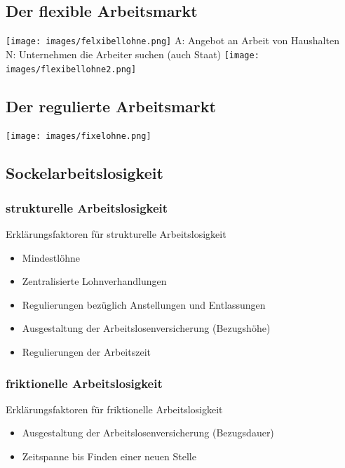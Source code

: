 \subsection{Der flexible Arbeitsmarkt}
\begin{multicols}{2}
	\texttt{[image: images/felxibellohne.png]}
	A: Angebot an Arbeit von Haushalten\\
	N: Unternehmen die Arbeiter suchen (auch Staat)
	\vfill\null
	\columnbreak
	\texttt{[image: images/flexibellohne2.png]}
\end{multicols}

\subsection{Der regulierte Arbeitsmarkt}
	\texttt{[image: images/fixelohne.png]}

\subsection{Sockelarbeitslosigkeit}
\begin{multicols}{2}
\subsubsection{strukturelle Arbeitslosigkeit}
\label{sec:strukturelleArbeitslosigkeit}
Erklärungsfaktoren für strukturelle Arbeitslosigkeit
\begin{itemize}
	\item Mindestlöhne
	\item Zentralisierte Lohnverhandlungen
	\item Regulierungen bezüglich Anstellungen und Entlassungen
	\item Ausgestaltung der Arbeitslosenversicherung (Bezugshöhe)
	\item Regulierungen der Arbeitszeit
\end{itemize}
\vfill\null
\columnbreak
\subsubsection{friktionelle Arbeitslosigkeit}
\label{sec:friktionelleArbeitslosigkeit}
Erklärungsfaktoren für friktionelle Arbeitslosigkeit
\begin{itemize}
	\item Ausgestaltung der Arbeitslosenversicherung (Bezugsdauer)
	\item Zeitspanne bis Finden einer neuen Stelle
\end{itemize}
\end{multicols}

